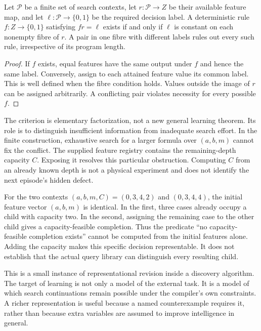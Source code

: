 \begin{SIIproposition}\label{SII:prop:search-feature}
Let $\mathcal P$ be a finite set of search contexts, let $r:\mathcal P\to Z$ be their available feature map, and let $\ell:\mathcal P\to\{0,1\}$ be the required decision label. A deterministic rule $f:Z\to\{0,1\}$ satisfying $fr=\ell$ exists if and only if $\ell$ is constant on each nonempty fibre of $r$. A pair in one fibre with different labels rules out every such rule, irrespective of its program length.
\end{SIIproposition}
\begin{proof}
If $f$ exists, equal features have the same output under $f$ and hence the same label. Conversely, assign to each attained feature value its common label. This is well defined when the fibre condition holds. Values outside the image of $r$ can be assigned arbitrarily. A conflicting pair violates necessity for every possible $f$.
\end{proof}

The criterion is elementary factorization, not a new general learning theorem. Its role is to distinguish insufficient information from inadequate search effort. In the finite construction, exhaustive search for a larger formula over $(a,b,m)$ cannot fix the conflict. The supplied feature registry contains the remaining-depth capacity $C$. Exposing it resolves this particular obstruction. Computing $C$ from an already known depth is not a physical experiment and does not identify the next episode's hidden defect.

\begin{SIIcounterexample}\label{SII:ex:missing-capacity}
For the two contexts $(a,b,m,C)=(0,3,4,2)$ and $(0,3,4,4)$, the initial feature vector $(a,b,m)$ is identical. In the first, three cases already occupy a child with capacity two. In the second, assigning the remaining case to the other child gives a capacity-feasible completion. Thus the predicate ``no capacity-feasible completion exists'' cannot be computed from the initial features alone. Adding the capacity makes this specific decision representable. It does not establish that the actual query library can distinguish every resulting child.
\end{SIIcounterexample}

This is a small instance of representational revision inside a discovery algorithm. The target of learning is not only a model of the external task. It is a model of which search continuations remain possible under the compiler's own constraints. A richer representation is useful because a named counterexample requires it, rather than because extra variables are assumed to improve intelligence in general.

